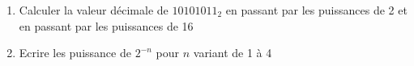 \documentclass[a4paper,11pt]{article}
\begin{document}
\begin{enumerate}
%

\item{Calculer la valeur décimale de $10101011_2$ en passant par les puissances de 2 et en passant par les puissances de 16}


\item{Ecrire les puissance de $2^{-n}$ pour $n$ variant de 1 à 4}
%
%
%

\end{enumerate}
\end{document}
